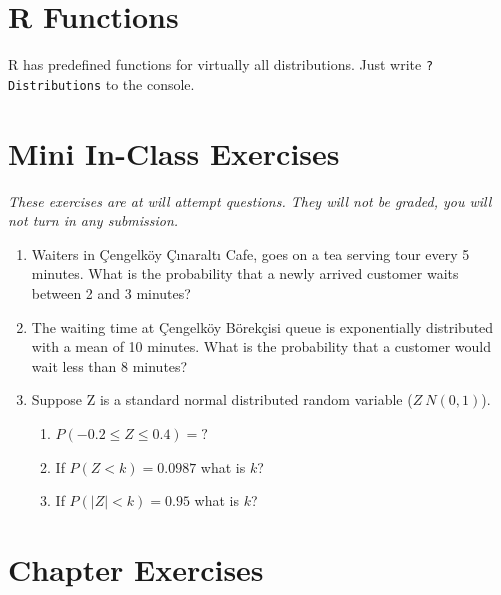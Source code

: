 \documentclass[]{book}
\providecommand{\tightlist}{%
  \setlength{\itemsep}{0pt}\setlength{\parskip}{0pt}}
\theoremstyle{definition}
\theoremstyle{definition}
\theoremstyle{definition}
\theoremstyle{remark}
\begin{document}
\hypertarget{r-functions}{%
\section{R Functions}\label{r-functions}}

R has predefined functions for virtually all distributions. Just write
\texttt{?Distributions} to the console.

\hypertarget{mini-in-class-exercises}{%
\section{Mini In-Class Exercises}\label{mini-in-class-exercises}}

\emph{These exercises are at will attempt questions. They will not be
graded, you will not turn in any submission.}

\begin{enumerate}
\def\labelenumi{\arabic{enumi}.}
\item
  Waiters in Çengelköy Çınaraltı Cafe, goes on a tea serving tour every
  5 minutes. What is the probability that a newly arrived customer waits
  between 2 and 3 minutes?
\item
  The waiting time at Çengelköy Börekçisi queue is exponentially
  distributed with a mean of 10 minutes. What is the probability that a
  customer would wait less than 8 minutes?
\item
  Suppose Z is a standard normal distributed random variable
  (\(Z ~ N(0,1)\)).

  \begin{enumerate}
  \def\labelenumii{\alph{enumii}.}
  \tightlist
  \item
    \(P(-0.2 \le Z \le 0.4) = ?\)
  \item
    If \(P(Z < k) = 0.0987\) what is \(k\)?
  \item
    If \(P(|Z| < k) = 0.95\) what is \(k\)?
  \end{enumerate}
\end{enumerate}

\hypertarget{chapter-exercises}{%
\section{Chapter Exercises}\label{chapter-exercises}}
\end{document}
